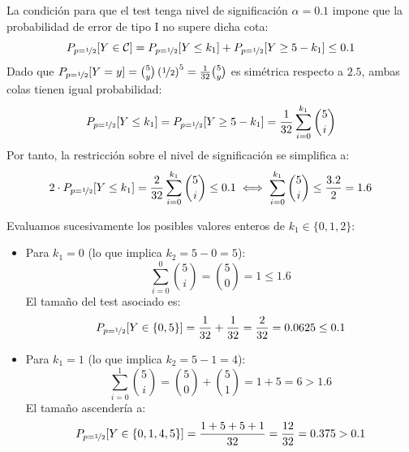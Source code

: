 \begin{ejemplo}
    La condición para que el test tenga nivel de significación $\alpha = 0.1$ impone que la probabilidad de error de tipo I no supere dicha cota:
    \begin{equation*}
        P_{p=\nicefrac{1}{2}}[Y \in \mathcal{C}] = P_{p=\nicefrac{1}{2}}[Y \leq k_1] + P_{p=\nicefrac{1}{2}}[Y \geq 5 - k_1] \leq 0.1
    \end{equation*}
    Dado que $P_{p=\nicefrac{1}{2}}[Y = y] = \binom{5}{y}\left(\nicefrac{1}{2}\right)^5 = \frac{1}{32}\binom{5}{y}$ es simétrica respecto a $2.5$, ambas colas tienen igual probabilidad:
    \begin{equation*}
        P_{p=\nicefrac{1}{2}}[Y \leq k_1] = P_{p=\nicefrac{1}{2}}[Y \geq 5 - k_1] = \frac{1}{32}\sum_{i=0}^{k_1}\binom{5}{i}
    \end{equation*}
    Por tanto, la restricción sobre el nivel de significación se simplifica a:
    \begin{equation*}
        2 \cdot P_{p=\nicefrac{1}{2}}[Y \leq k_1] = \frac{2}{32}\sum_{i=0}^{k_1}\binom{5}{i} \leq 0.1 \iff \sum_{i=0}^{k_1}\binom{5}{i} \leq \frac{3.2}{2} = 1.6
    \end{equation*}

    Evaluamos sucesivamente los posibles valores enteros de $k_1 \in \{0, 1, 2\}$:
    \begin{itemize}
        \item Para $k_1 = 0$ (lo que implica $k_2 = 5 - 0 = 5$):
        \begin{equation*}
            \sum_{i=0}^{0} \binom{5}{i} = \binom{5}{0} = 1 \leq 1.6
        \end{equation*}
        El tamaño del test asociado es:
        \begin{equation*}
            P_{p=\nicefrac{1}{2}}[Y \in \{0, 5\}] = \frac{1}{32} + \frac{1}{32} = \frac{2}{32} = 0.0625 \leq 0.1
        \end{equation*}
        \item Para $k_1 = 1$ (lo que implica $k_2 = 5 - 1 = 4$):
        \begin{equation*}
            \sum_{i=0}^{1} \binom{5}{i} = \binom{5}{0} + \binom{5}{1} = 1 + 5 = 6 > 1.6
        \end{equation*}
        El tamaño ascendería a:
        \begin{equation*}
            P_{p=\nicefrac{1}{2}}[Y \in \{0, 1, 4, 5\}] = \frac{1 + 5 + 5 + 1}{32} = \frac{12}{32} = 0.375 > 0.1
        \end{equation*}


\end{itemize}
\end{ejemplo}

